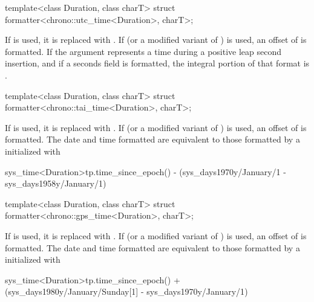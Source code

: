 %
\begin{itemdecl}
template<class Duration, class charT>
  struct formatter<chrono::utc_time<Duration>, charT>;
\end{itemdecl}

\begin{itemdescr}
\pnum
\remarks
If  is used,
it is replaced with .
If  (or a modified variant of ) is used,
an offset of  is formatted.
If the argument represents a time during a positive leap second insertion,
and if a seconds field is formatted,
the integral portion of that format is
.
\end{itemdescr}

%
\begin{itemdecl}
template<class Duration, class charT>
  struct formatter<chrono::tai_time<Duration>, charT>;
\end{itemdecl}

\begin{itemdescr}
\pnum
\remarks
If  is used,
it is replaced with .
If  (or a modified variant of ) is used,
an offset of  is formatted.
The date and time formatted are equivalent to
those formatted by a  initialized with
\begin{codeblock}
sys_time<Duration>{tp.time_since_epoch()} -
  (sys_days{1970y/January/1} - sys_days{1958y/January/1})
\end{codeblock}
\end{itemdescr}

%
\begin{itemdecl}
template<class Duration, class charT>
  struct formatter<chrono::gps_time<Duration>, charT>;
\end{itemdecl}

\begin{itemdescr}
\pnum
\remarks
If  is used,
it is replaced with .
If  (or a modified variant of ) is used,
an offset of  is formatted.
The date and time formatted are equivalent to
those formatted by a  initialized with
\begin{codeblock}
sys_time<Duration>{tp.time_since_epoch()} +
  (sys_days{1980y/January/Sunday[1]} - sys_days{1970y/January/1})
\end{codeblock}
\end{itemdescr}

